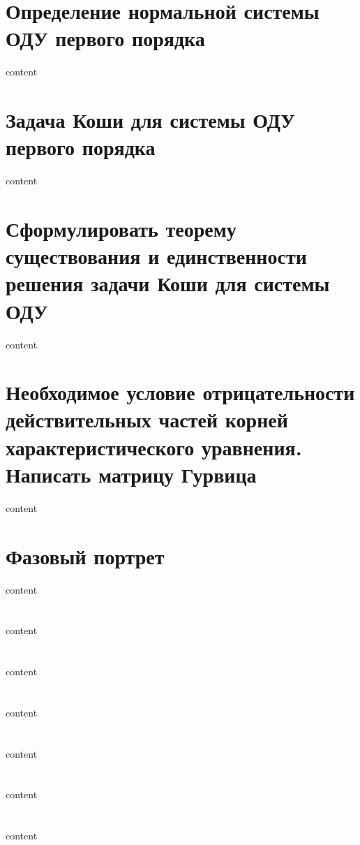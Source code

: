 \section{Определение нормальной системы ОДУ первого порядка}

content

\section{Задача Коши для системы ОДУ первого порядка}

content

\section{Сформулировать теорему существования и единственности решения задачи Коши для системы ОДУ}

content

\section{Необходимое условие отрицательности действительных частей корней характеристического уравнения. Написать матрицу Гурвица}

content

\section{Фазовый портрет}

content

\section{}

content

\section{}

content

\section{}

content

\section{}

content

\section{}

content

\section{}

content
